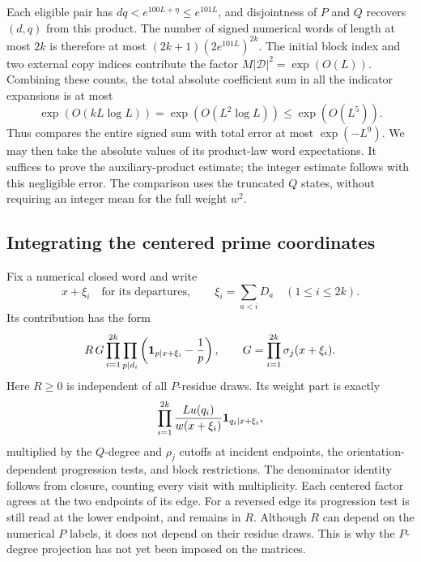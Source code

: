 Each eligible pair has $dq<e^{100L+\eta}\le e^{101L}$, and disjointness
of $P$ and $Q$ recovers $(d,q)$ from this product. The number of signed
numerical words of length at most $2k$ is therefore at most
$(2k+1)(2e^{101L})^{2k}$. The initial block index and two external
copy indices contribute the factor $M|\mathcal D|^2=\exp(O(L))$.
Combining these counts, the total absolute coefficient sum in all the
indicator expansions is at most
\begin{equation}\label{q:word-comparison-budget}
 \exp(O(kL\log L))=\exp(O(L^2\log L))
 \le\exp(O(L^5)).
\end{equation}
Thus  compares the entire signed sum with
total error at most $\exp(-L^9)$. We may then take the absolute values
of its product-law word expectations. It suffices to prove the
auxiliary-product estimate; the integer estimate follows with this
negligible error. The comparison uses the truncated $Q$ states,
without requiring an integer mean for the full weight $w^2$.

\subsection{Integrating the centered prime coordinates}

Fix a numerical closed word and write
\[
 x+\xi_i\quad\text{for its departures},\qquad
 \xi_i=\sum_{a<i}D_a\quad(1\le i\le2k).
\]
Its contribution has the form
\begin{equation}\label{q:word-product}
 R\,G\prod_{i=1}^{2k}\prod_{p\mid d_i}
       \left(\mathbf 1_{p\mid x+\xi_i}-\frac1p\right),
 \qquad G=\prod_{i=1}^{2k}\sigma_j(x+\xi_i).
\end{equation}
Here $R\ge0$ is independent of all $P$-residue draws.  Its weight part
is exactly
\begin{equation}\label{q:departure-weights}
 \prod_{i=1}^{2k}
 \frac{Lu(q_i)}{w(x+\xi_i)}\mathbf 1_{q_i\mid x+\xi_i},
\end{equation}
multiplied by the $Q$-degree and $\rho_j$ cutoffs at incident endpoints,
the orientation-dependent progression tests, and block restrictions.
The denominator identity follows from closure, counting every visit
with multiplicity.  Each centered factor agrees at the two endpoints
of its edge.  For a reversed edge its progression test is still read
at the lower endpoint, and remains in $R$.
Although $R$ can depend on the numerical $P$ labels, it does not depend
on their residue draws.  This is why the $P$-degree projection has not
yet been imposed on the matrices.

